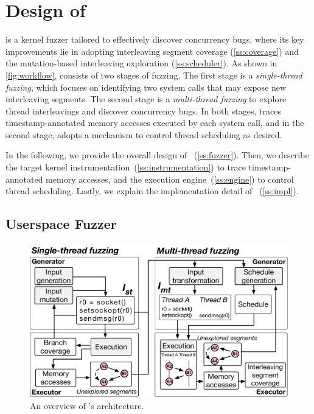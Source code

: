 \section{Design of \sys}
\label{s:impl}

\sys is a kernel fuzzer tailored to effectively discover concurrency
bugs, where its key improvements lie in adopting interleaving segment
coverage (\autoref{ss:coverage}) and the mutation-based interleaving
exploration (\autoref{ss:scheduler}).
%
As shown in \autoref{fig:workflow}, \sys consists of two stages of
fuzzing.
%
The first stage is a \textit{single-thread fuzzing}, which focuses on
identifying two system calls that may expose new interleaving
segments.
%
The second stage is a \textit{multi-thread fuzzing} to explore thread
interleavings and discover concurrency bugs.
%
In both stages, \sys traces timestamp-annotated memory accesses
executed by each system call, and in the second stage, \sys adopts a
mechanism to control thread scheduling as desired.



In the following, we provide the overall design of
\sys~(\autoref{ss:fuzzer}).
%
Then, we describe the target kernel
instrumentation~(\autoref{ss:instrumentation}) to trace
timestamp-annotated memory accesses, and the execution
engine~(\autoref{ss:engine}) to control thread scheduling.
%
Lastly, we explain the implementation detail of
\sys~(\autoref{ss:impl}).




\subsection{Userspace Fuzzer}
\label{ss:fuzzer}

\begin{figure}
  \centering
  \includegraphics[width=\linewidth]{fig/architecture.pdf}
  \caption{An overview of \sys's architecture.}
  \label{fig:workflow}
\end{figure}


